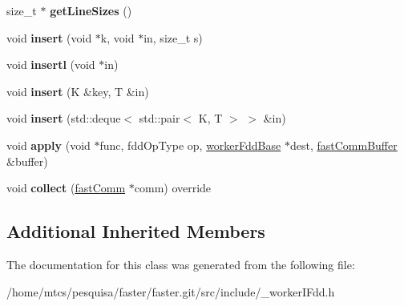 \begin{DoxyCompactItemize}
\item 
\hypertarget{classfaster_1_1__workerIFdd_a4e2b03bca6178ed85f0cbdb65418aab2}{}size\+\_\+t $\ast$ {\bfseries get\+Line\+Sizes} ()\label{classfaster_1_1__workerIFdd_a4e2b03bca6178ed85f0cbdb65418aab2}

\item 
\hypertarget{classfaster_1_1__workerIFdd_aa806f1fef09dbeaaca74b09821e60935}{}void {\bfseries insert} (void $\ast$k, void $\ast$in, size\+\_\+t s)\label{classfaster_1_1__workerIFdd_aa806f1fef09dbeaaca74b09821e60935}

\item 
\hypertarget{classfaster_1_1__workerIFdd_a0c1716a3b4fb62fa1c4c9ffe95761ef4}{}void {\bfseries insertl} (void $\ast$in)\label{classfaster_1_1__workerIFdd_a0c1716a3b4fb62fa1c4c9ffe95761ef4}

\item 
\hypertarget{classfaster_1_1__workerIFdd_ac248aade1f81e85a4f8a48ba8b6fb9b7}{}void {\bfseries insert} (K \&key, T \&in)\label{classfaster_1_1__workerIFdd_ac248aade1f81e85a4f8a48ba8b6fb9b7}

\item 
\hypertarget{classfaster_1_1__workerIFdd_a02d3affac82eaf9e1fe524e5cbcd44d1}{}void {\bfseries insert} (std\+::deque$<$ std\+::pair$<$ K, T $>$ $>$ \&in)\label{classfaster_1_1__workerIFdd_a02d3affac82eaf9e1fe524e5cbcd44d1}

\item 
\hypertarget{classfaster_1_1__workerIFdd_aa9bd2045e6a85cd39f868ad50fbcb5c4}{}void {\bfseries apply} (void $\ast$func, fdd\+Op\+Type op, \hyperlink{classfaster_1_1workerFddBase}{worker\+Fdd\+Base} $\ast$dest, \hyperlink{classfaster_1_1fastCommBuffer}{fast\+Comm\+Buffer} \&buffer)\label{classfaster_1_1__workerIFdd_aa9bd2045e6a85cd39f868ad50fbcb5c4}

\item 
\hypertarget{classfaster_1_1__workerIFdd_a256bac01a1de34d3debeca359783f9f6}{}void {\bfseries collect} (\hyperlink{classfaster_1_1fastComm}{fast\+Comm} $\ast$comm) override\label{classfaster_1_1__workerIFdd_a256bac01a1de34d3debeca359783f9f6}

\end{DoxyCompactItemize}
\subsection*{Additional Inherited Members}


The documentation for this class was generated from the following file\+:\begin{DoxyCompactItemize}
\item 
/home/mtcs/pesquisa/faster/faster.\+git/src/include/\+\_\+worker\+I\+Fdd.\+h\end{DoxyCompactItemize}

